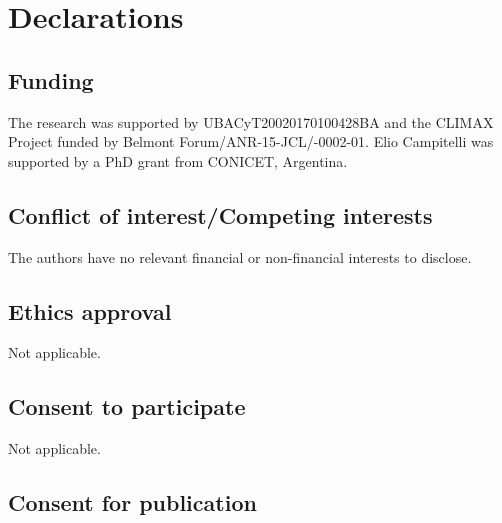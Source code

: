 \documentclass[pdflatex,sn-basic]{sn-jnl}
\theoremstyle{thmstyleone}%
\theoremstyle{thmstyletwo}%
\theoremstyle{thmstylethree}%
\begin{document}
\backmatter

\hypertarget{declarations}{%
\section*{Declarations}\label{declarations}}

\hypertarget{funding}{%
\subsection*{Funding}\label{funding}}

The research was supported by UBACyT20020170100428BA and the CLIMAX Project funded by Belmont Forum/ANR-15-JCL/-0002-01. Elio Campitelli was supported by a PhD grant from CONICET, Argentina.

\hypertarget{conflict-of-interestcompeting-interests}{%
\subsection*{Conflict of interest/Competing interests}\label{conflict-of-interestcompeting-interests}}

The authors have no relevant financial or non-financial interests to disclose.

\hypertarget{ethics-approval}{%
\subsection*{Ethics approval}\label{ethics-approval}}

Not applicable.

\hypertarget{consent-to-participate}{%
\subsection*{Consent to participate}\label{consent-to-participate}}

Not applicable.

\hypertarget{consent-for-publication}{%
\subsection*{Consent for publication}\label{consent-for-publication}}
\end{document}
